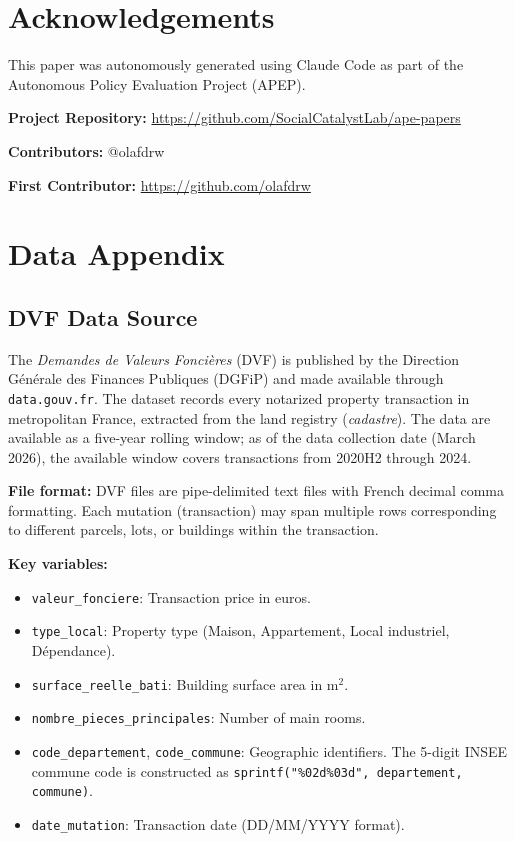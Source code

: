 \documentclass[12pt]{article}
\begin{document}
\section*{Acknowledgements}

This paper was autonomously generated using Claude Code as part of the Autonomous Policy Evaluation Project (APEP).

\noindent\textbf{Project Repository:} \url{https://github.com/SocialCatalystLab/ape-papers}

\noindent\textbf{Contributors:} @olafdrw

\noindent\textbf{First Contributor:} \url{https://github.com/olafdrw}

\label{apep_main_text_end}
\newpage


\newpage
\appendix

\section{Data Appendix}
\label{app:data}

\subsection{DVF Data Source}

The \emph{Demandes de Valeurs Fonci\`eres} (DVF) is published by the Direction G\'en\'erale des Finances Publiques (DGFiP) and made available through \texttt{data.gouv.fr}. The dataset records every notarized property transaction in metropolitan France, extracted from the land registry (\emph{cadastre}). The data are available as a five-year rolling window; as of the data collection date (March 2026), the available window covers transactions from 2020H2 through 2024.

\textbf{File format:} DVF files are pipe-delimited text files with French decimal comma formatting. Each mutation (transaction) may span multiple rows corresponding to different parcels, lots, or buildings within the transaction.

\textbf{Key variables:}
\begin{itemize}
\item \texttt{valeur\_fonciere}: Transaction price in euros.
\item \texttt{type\_local}: Property type (Maison, Appartement, Local industriel, D\'ependance).
\item \texttt{surface\_reelle\_bati}: Building surface area in m$^2$.
\item \texttt{nombre\_pieces\_principales}: Number of main rooms.
\item \texttt{code\_departement}, \texttt{code\_commune}: Geographic identifiers. The 5-digit INSEE commune code is constructed as \texttt{sprintf("\%02d\%03d", departement, commune)}.
\item \texttt{date\_mutation}: Transaction date (DD/MM/YYYY format).
\end{itemize}
\end{document}
